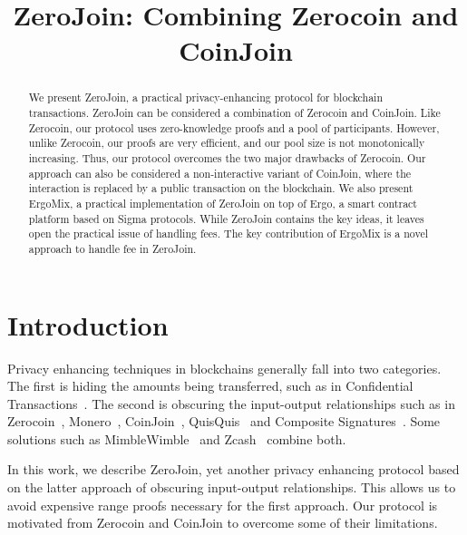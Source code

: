 \documentclass[runningheads]{llncs}
\newcommand{\mixname}{ErgoMix\xspace}
\newcommand{\zerocoin}{Zerocoin\xspace}
\begin{document}
\newcommand{\algname}{ZeroJoin\xspace}
\title{\algname: Combining \zerocoin and CoinJoin}

\maketitle

\begin{abstract}

We present \algname, a practical privacy-enhancing protocol for blockchain transactions. \algname can be considered a combination of \zerocoin and CoinJoin. 
Like \zerocoin, our protocol uses zero-knowledge proofs and a pool of
participants. However, unlike \zerocoin, our proofs are very efficient, and our pool size is not monotonically increasing.
Thus, our protocol overcomes the two major drawbacks of \zerocoin. Our approach can also be considered a non-interactive variant of CoinJoin, where the interaction is replaced by a public transaction on the blockchain. We also present \mixname, a practical implementation of \algname on top of Ergo, a smart contract platform based on Sigma protocols. While \algname contains the key ideas, it leaves open the practical issue of handling fees. The key contribution of \mixname is a novel approach to handle fee in \algname. 

\end{abstract}

\section{Introduction}
\label{intro}

Privacy enhancing techniques in blockchains generally fall into two categories. The first is hiding the amounts being transferred, such as in Confidential Transactions~\cite{ct}. The second is obscuring the input-output relationships such as in \zerocoin~\cite{zerocoin}, Monero~\cite{monero}, CoinJoin~\cite{coinjoin}, QuisQuis~\cite{quisquis} and Composite Signatures~\cite{composite}. Some solutions such as MimbleWimble~\cite{mw} and Zcash~\cite{zcash,zcash1} combine both.

In this work, we describe \algname, yet another privacy enhancing protocol based on the latter approach of obscuring input-output relationships. This allows us to avoid expensive range proofs necessary for the first approach. Our protocol is motivated from \zerocoin and CoinJoin to overcome some of their limitations.
\end{document}

